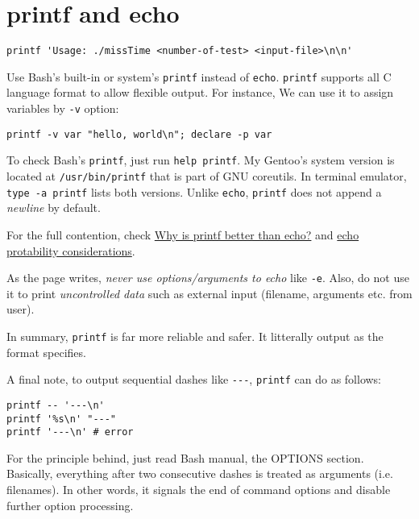 \section{printf and echo}
\label{sec:printf-echo}

\begin{lstlisting}
printf 'Usage: ./missTime <number-of-test> <input-file>\n\n'
\end{lstlisting}

Use Bash's built-in or system's \lstinline|printf| instead of
\lstinline|echo|. \lstinline|printf| supports all C language
format to allow flexible output. For instance, We can use it to
assign variables by \lstinline|-v| option:

\begin{lstlisting}
printf -v var "hello, world\n"; declare -p var
\end{lstlisting}

To check Bash's \lstinline|printf|, just run
\lstinline|help printf|. My Gentoo's system version is located at
\lstinline|/usr/bin/printf| that is part of GNU coreutils. In
terminal emulator, \lstinline|type -a printf| lists both
versions. Unlike \lstinline|echo|, \lstinline|printf| does not
append a \textit{newline} by default.

For the full contention, check
\href{https://unix.stackexchange.com/q/65803/74407}{Why is printf
  better than echo?} and
\href{https://wiki.bash-hackers.org/commands/builtin/echo}{echo
  protability considerations}.

As the page writes, \textit{never use options/arguments to echo}
like \verb|-e|. Also, do not use it to print \textit{uncontrolled
  data} such as external input (filename, arguments etc. from user).

In summary, \lstinline|printf| is far more reliable and safer. It
litterally output as the format specifies.

A final note, to output sequential dashes like \verb|---|,
\lstinline|printf| can do as follows:

\begin{lstlisting}
printf -- '---\n'
printf '%s\n' "---"
printf '---\n' # error
\end{lstlisting}

For the principle behind, just read Bash manual, the OPTIONS
section. Basically, everything after two consecutive dashes is
treated as arguments (i.e. filenames). In other words, it signals the
end of command options and disable further option processing.

